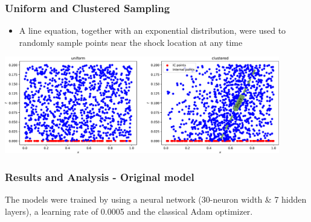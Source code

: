 \documentclass[aspectratio=169]{beamer}
\begin{document}
\begin{frame}\frametitle{Uniform and Clustered Sampling}
	\begin{itemize}
		\item A line equation, together with an exponential distribution, were used to randomly sample points near
		the shock location at any time
	\end{itemize}
	
	\begin{center}
		\includegraphics[width=0.9\textwidth]{Figures/points_distribution.pdf}
	\end{center}
	
	
\end{frame}




\begin{frame}\frametitle{Results and Analysis - Original model}
	The models were trained by using a neural network (30-neuron width \& 7 hidden layers), a learning rate of 0.0005
	and the classical Adam optimizer.
	
	\begin{center}
		 \\
	\end{center}
	
	
\end{frame}
\end{document}

